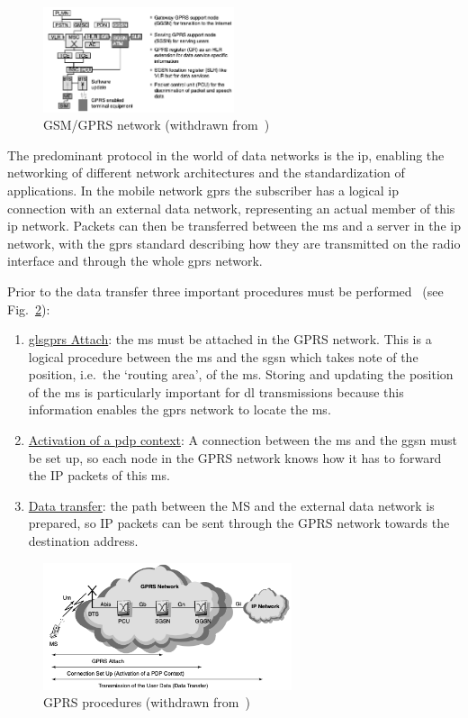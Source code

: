 \begin{figure}[!hbt]
\centering
    \includegraphics[width=0.5\textwidth]{./img/gprs-network.png}
  \caption{GSM/GPRS network (withdrawn from~\cite{sanders2003gprs})}%
\label{fig:gprs-network}
\end{figure}

The predominant protocol in the world of data networks is the \gls{ip}, enabling
the networking of different network architectures and the standardization of
applications. In the mobile network \gls{gprs} the subscriber has a logical
\gls{ip} connection with an external data network, representing an actual member
of this \gls{ip} network. Packets can then be transferred between the \gls{ms}
and a server in the \gls{ip} network, with the \gls{gprs} standard describing
how they are transmitted on the radio interface and through the whole \gls{gprs}
network.

Prior to the data transfer three important procedures must be
performed~\cite{sanders2003gprs} (see Fig.~\ref{fig:gprs-procedures}):
\begin{enumerate}
\item \uline{gls{gprs} Attach}: the \gls{ms} must be attached in the GPRS network. This is a logical procedure between the \gls{ms} and the \gls{sgsn}
  which takes note of the position, i.e.~the `routing area', of the \gls{ms}. Storing and updating the position of the \gls{ms} is particularly
  important for \gls{dl} transmissions because this information enables the \gls{gprs}
  network to locate the \gls{ms}.
\item \uline{Activation of a \gls{pdp} context}: A
  connection between the \gls{ms} and the \gls{ggsn} must be set up, so each
  node in the GPRS network knows how it has to forward the IP packets of this
  \gls{ms}.
\item \uline{Data transfer}: the path between the MS and the external data network is
  prepared, so IP packets can be sent through the GPRS network towards the
  destination address.
\end{enumerate}
\begin{figure}[!hbt]
\centering
    \includegraphics[width=0.65\textwidth]{./img/gprs-procedures.png}
  \caption{GPRS procedures (withdrawn from~\cite{sanders2003gprs})}%
\label{fig:gprs-procedures}
\end{figure}


